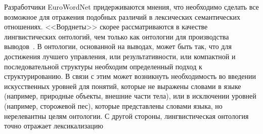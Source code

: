 \begin{multicols}{2}
     Разработчики EuroWordNet придерживаются мнения, что необходимо 
сделать все возможное для отражения подобных различий в лексических 
семантических отношениях. <<Ворднеты>> скорее рассматриваются в 
качестве лингвистических онтологий, чем только как онтологии для 
производства выводов~\cite{1koz, 8koz}. В онтологии, основанной на выводах, 
может быть так, что для достижения лучшего управления, или 
результативности, или компактной и последовательной структуры необходим 
определенный подход к структурированию. В связи с этим может возникнуть 
необходимость во введении искусственных уровней для понятий, которые не 
выражены словами в языке (например, природные объекты, внешние части 
тела), или в исключении уровней (например, сторожевой пес), которые 
представлены словами языка, но нерелевантны целям онтологии. С другой 
стороны, лингвистическая онтология точно отражает лексикализацию\linebreak\vspace*{-12pt}
\pagebreak
\end{multicols}

\begin{figure} %
\vspace*{1pt}
\begin{center}
\mbox{%
\epsfxsize=157.23mm
}
\end{center}
\vspace*{-12pt}
\vspace*{9pt}
\end{figure}

